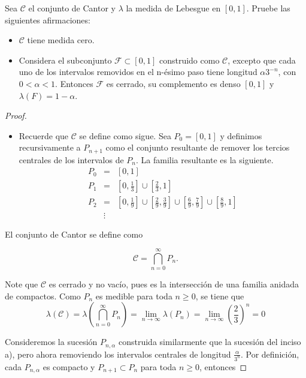 \documentclass[12pt]{article}
\newenvironment{problem}[2][Problema]{\begin{trivlist}
\item[\hskip \labelsep {\bfseries #1}\hskip \labelsep {\bfseries #2.}]}{\end{trivlist}}
\begin{document}
\begin{problem}{1} Sea $\mathcal{C}$ el conjunto de Cantor y $\lambda$ la medida de Lebesgue en $[0, 1]$. Pruebe las siguientes afirmaciones:
\begin{itemize}
    \item[a)] $\mathcal{C}$ tiene medida cero.
    \item[b)] Considera el subconjunto $\mathcal{F} \subset [0, 1]$ construido como $\mathcal{C}$, excepto que cada uno de los intervalos removidos en el n-ésimo paso tiene longitud $\alpha 3^{-n}$, con $0 < \alpha < 1$. Entonces $\mathcal{F}$ es cerrado, su complemento es denso $[0,1]$ y $\lambda(F) = 1 - \alpha$.
\end{itemize}
\end{problem}
\begin{proof}

\begin{itemize}
    \item[a)] Recuerde que $\mathcal{C}$ se define como sigue. Sea $P_0 = [0, 1]$ y definimos recursivamente a $P_{n+1}$ como el conjunto resultante de remover los tercios centrales de los intervalos de $P_n$. La familia resultante es la siguiente.
    \begin{eqnarray*}
    P_0  &=& [0, 1]\\
    P_1 &=& \left[0, \frac{1}{3}\right] \cup \left[\frac{2}{3}, 1\right] \\
    P_2 &=& \left[0, \frac{1}{9}\right]\cup \left[\frac{2}{9}, \frac{3}{9}\right]\cup \left[\frac{6}{9}, \frac{7}{9} \right]\cup \left[\frac{8}{9}, 1\right] \\
    & \vdots &
    \end{eqnarray*}
\end{itemize}
El conjunto de Cantor se define como 

$$\mathcal{C} = \bigcap_{n=0}^\infty P_n.$$

Note que $\mathcal{C}$ es cerrado y no vacío, pues es la intersección de una familia anidada de compactos. Como $P_n$ es medible para toda $n \geq 0$, se tiene que 
$$\lambda(\mathcal{C}) = \lambda\left(\bigcap_{n=0}^{\infty} P_n \right) = \lim_{n\to \infty}\lambda(P_n) =  \lim_{n\to \infty} \left(\frac{2}{3} \right)^n = 0 $$



\item[b)] Consideremos la sucesión $P_{n, \alpha}$ construida similarmente que la sucesión del inciso a), pero ahora removiendo los intervalos centrales de longitud  $\frac{\alpha}{3^n}$. Por definición, cada $P_{n, \alpha}$ es compacto y $P_{n+1} \subset P_n$ para toda $n\geq 0$, entonces


\end{proof}
\end{document}
